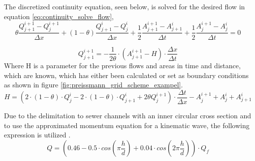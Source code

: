 
The discretized continuity equation, seen below, is solved for the desired flow in equation \ref{eq:continuity_solve_flow},
\begin{equation}
    \theta \frac{Q_{j+1}^{i+1}-Q_j^{i+1}}{\Delta x}+(1-\theta)\frac{Q_{j+1}^i - Q_j^i}{\Delta x}+
    \frac{1}{2}\frac{A_{j+1}^{i+1}-A_{j+1}^i}{\Delta t} + \frac{1}{2} \frac{A_{j}^{i+1} - A_j^i}{\Delta t} = 0
\end{equation}

\begin{equation}\label{eq:continuity_solve_flow}
    Q_{j+1}^{i+1} = - \frac{1}{2\theta}\cdot\left(A_{j+1}^{i+1}-H\right)\cdot\frac{\Delta x}{\Delta t}
\end{equation}
Where H is a parameter for the previous flows and areas in time and distance, which are known, which has either been calculated or set as boundary conditions as shown in figure \ref{fig:preissmann_grid_scheme_exampel}. 
\begin{equation}
    H = \left(2\cdot(1-\theta)\cdot Q_j^i-2\cdot(1-\theta)\cdot Q_{j+1}^i+2\theta Q_j^{i+1}\right)\cdot\frac{\Delta t}{\Delta x}- A_{j}^{i+1}+A_j^i+A_{j+1}^i
\end{equation}

Due to the delimitation to sewer channels with an inner circular cross section and to use the approximated momentum equation for a kinematic wave,
the following expression is utilized \cite{ikke_stationear}. %
\begin{equation}\label{eq:calc_for_flowv2}
     Q = \left(0.46-0.5 \cdot cos\left(\pi \frac{h}{d}\right)+0.04\cdot cos\left(2\pi\frac{h}{d}\right)\right)\cdot Q_f
\end{equation}

